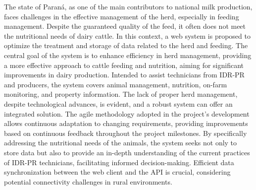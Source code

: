 
\begin{abstractutfpr}%
  The state of Paraná, as one of the main contributors to national milk production, faces challenges in the effective management of the herd, especially in feeding management. Despite the guaranteed quality of the feed, it often does not meet the nutritional needs of dairy cattle. In this context, a web system is proposed to optimize the treatment and storage of data related to the herd and feeding. The central goal of the system is to enhance efficiency in herd management, providing a more effective approach to cattle feeding and nutrition, aiming for significant improvements in dairy production. Intended to assist technicians from \gls{IDR-PR} and producers, the system covers animal management, nutrition, on-farm monitoring, and property information. The lack of proper herd management, despite technological advances, is evident, and a robust system can offer an integrated solution. The agile methodology adopted in the project's development allows continuous adaptation to changing requirements, providing improvements based on continuous feedback throughout the project milestones. By specifically addressing the nutritional needs of the animals, the system seeks not only to store data but also to provide an in-depth understanding of the current practices of \gls{IDR-PR} technicians, facilitating informed decision-making. Efficient data synchronization between the web client and the API is crucial, considering potential connectivity challenges in rural environments.
\end{abstractutfpr}
